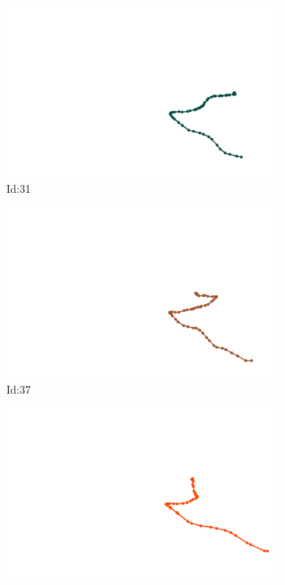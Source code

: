 \documentclass[12pt,twoside]{report}
\begin{document}
\begin{figure}
\centering
\begin{subfigure}[b]{0.20\textwidth}
\centering
\includegraphics[width=\textwidth]{../trajectories/31.png}
\caption{Id:31}
\end{subfigure}
\begin{subfigure}[b]{0.20\textwidth}
\centering
\includegraphics[width=\textwidth]{../trajectories/37.png}
\caption{Id:37}
\end{subfigure}
\begin{subfigure}[b]{0.20\textwidth}
\centering
\includegraphics[width=\textwidth]{../trajectories/62.png}

\end{subfigure}
\end{figure}
\end{document}
